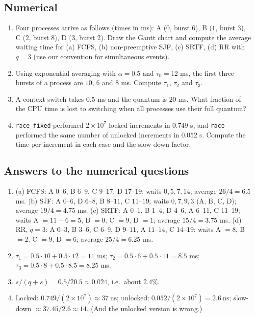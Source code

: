 \documentclass[11pt,a4paper]{article}
\begin{document}
\subsection*{Numerical}
\begin{enumerate}[leftmargin=1.6em,resume]
  \item Four processes arrive as follows (times in ms): A ($0$, burst $6$), B ($1$, burst $3$), C ($2$, burst $8$), D ($3$, burst $2$). Draw the Gantt chart and compute the average waiting time for (a) FCFS, (b) non-preemptive SJF, (c) SRTF, (d) RR with $q=3$ (use our convention for simultaneous events).
  \item Using exponential averaging with $\alpha = 0.5$ and $\tau_0 = 12$ ms, the first three bursts of a process are $10$, $6$ and $8$ ms. Compute $\tau_1$, $\tau_2$ and $\tau_3$.
  \item A context switch takes $0.5$ ms and the quantum is $20$ ms. What fraction of the CPU time is lost to switching when all processes use their full quantum?
  \item \texttt{race\_fixed} performed $2\times10^{7}$ locked increments in $0.749$ s, and \texttt{race} performed the same number of unlocked increments in $0.052$ s. Compute the time per increment in each case and the slow-down factor.
\end{enumerate}

\subsection*{Answers to the numerical questions}
\begin{enumerate}[leftmargin=1.6em,start=9]
  \item (a) FCFS: A $0$--$6$, B $6$--$9$, C $9$--$17$, D $17$--$19$; waits $0,5,7,14$; average $26/4 = 6.5$ ms.
  (b) SJF: A $0$--$6$, D $6$--$8$, B $8$--$11$, C $11$--$19$; waits $0,7,9,3$ (A, B, C, D); average $19/4 = 4.75$ ms.
  (c) SRTF: A $0$--$1$, B $1$--$4$, D $4$--$6$, A $6$--$11$, C $11$--$19$; waits A $=11-6=5$, B $=0$, C $=9$, D $=1$; average $15/4 = 3.75$ ms.
  (d) RR, $q=3$: A $0$--$3$, B $3$--$6$, C $6$--$9$, D $9$--$11$, A $11$--$14$, C $14$--$19$; waits A $=8$, B $=2$, C $=9$, D $=6$; average $25/4 = 6.25$ ms.
  \item $\tau_1 = 0.5\cdot10 + 0.5\cdot12 = 11$ ms; $\tau_2 = 0.5\cdot6 + 0.5\cdot11 = 8.5$ ms; $\tau_3 = 0.5\cdot8 + 0.5\cdot8.5 = 8.25$ ms.
  \item $s/(q+s) = 0.5/20.5 \approx 0.024$, i.e.\ about $2.4\%$.
  \item Locked: $0.749/(2\times10^{7}) \approx 37\ \text{ns}$; unlocked: $0.052/(2\times10^{7}) = 2.6\ \text{ns}$; slow-down $\approx 37.45/2.6 \approx 14$. (And the unlocked version is wrong.)
\end{enumerate}
\end{document}
